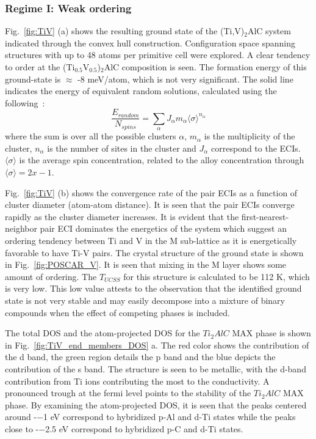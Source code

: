 \documentclass[preprint,amsmath,amssymb,aps, prb,showkeys]{revtex4-1}
\newcommand{\fig}[1]{Fig.~\ref{#1}}
\begin{document}
\subsubsection{Regime I: Weak ordering}

\fig{fig:TiV} (a) shows the resulting ground state of the (Ti,V)$_2$AlC system indicated through the convex hull construction. 
Configuration space spanning structures with up to 48 atoms per primitive cell were explored. A clear tendency to order  at the (Ti$_{0.5}$V$_{0.5}$)$_2$AlC composition is seen. The formation energy of this ground-state is $\approx$ -8 meV/atom, which is not very significant. The solid line indicates the energy of equivalent random solutions, calculated using the following~\cite{liu2005structure}:
\begin{equation}
\frac{E_{random}}{N_{spins}} = \sum_{\alpha} J_{\alpha} m_{\alpha}\langle \sigma \rangle^{n_{\alpha}} 
\end{equation}
where the sum is over all the possible clusters $\alpha$, $m_{\alpha}$ is the multiplicity of the cluster, $n_{\alpha}$ is the number of sites in the cluster and $J_{\alpha}$ correspond to the ECIs. $\langle \sigma \rangle$ is the average spin concentration, related to the alloy concentration through $\langle \sigma \rangle = 2x-1$.

\fig{fig:TiV} (b) shows the convergence rate of the pair ECIs as a function of cluster diameter (atom-atom distance). It is seen that the pair ECIs converge rapidly as the cluster diameter increases. It is evident that the first-nearest-neighbor pair ECI dominates the energetics of the system which suggest an ordering tendency between Ti and V in the M sub-lattice as it is energetically favorable to have Ti-V pairs.
The crystal structure of the ground state is shown in \fig{fig:POSCAR_V}. It is seen that mixing in the M layer shows some amount of ordering. The $T_{UCSS}$ for this structure is calculated to be 112 K, which is very low. This low value attests to the observation that the identified ground state is not very stable and may easily decompose into a mixture of binary compounds when the effect of competing phases is included.

The  total DOS and the atom-projected  DOS  for the $Ti_2AlC$ MAX phase is shown in \fig{fig:TiV_end_members_DOS} a. The red color shows the contribution of the d band, the green region details the p band and the blue depicts the contribution of the s band. The structure is seen to be metallic, with the d-band contribution from Ti ions contributing the most to the conductivity. A pronounced trough at the fermi level points to the stability of the $Ti_2AlC$ MAX phase. By examining the atom-projected DOS, it is seen that the peaks centered around -−1 eV correspond to hybridized p-Al and d-Ti states while the peaks close to -−2.5 eV correspond to hybridized p-C and d-Ti states. 
\end{document}
